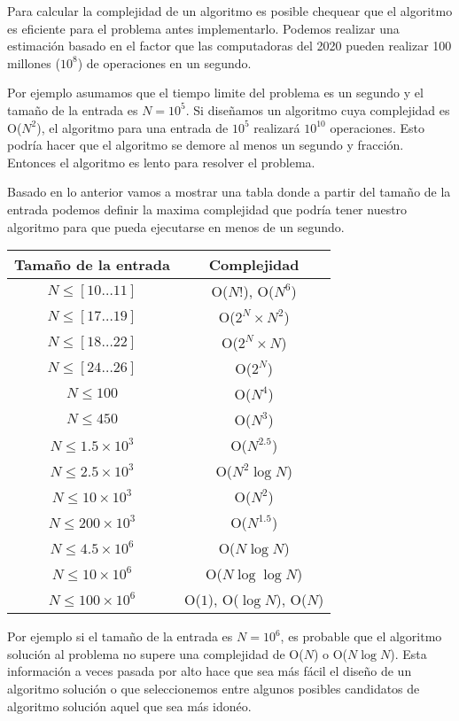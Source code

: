 Para calcular la complejidad de un algoritmo es posible chequear que el algoritmo es eficiente para el problema antes implementarlo. Podemos realizar una estimación basado en el factor que las computadoras del 2020 pueden realizar 100 millones ($10^{8}$) de operaciones en un segundo. 

Por ejemplo asumamos que el tiempo limite del problema es un segundo y el tamaño de la entrada es $N=10^5$. Si diseñamos un algoritmo cuya complejidad es O($N^2$), el algoritmo para una entrada de $10^5$ realizará $10^{10}$ operaciones. Esto podría hacer que el algoritmo se demore al menos un segundo y fracción. Entonces el algoritmo es lento para resolver el problema.

Basado en lo anterior vamos a mostrar una tabla donde a partir del tamaño de la entrada podemos definir la maxima complejidad que podría tener nuestro algoritmo para que pueda ejecutarse en menos de un segundo.

{\centering

\begin{tabular}{|c|c|}
	\hline
\textbf{Tamaño de la entrada}	&  \textbf{Complejidad} \\
	\hline
$N \le [10 \dots 11]$	& O($N!$), O($N^6$) \\
	\hline
$N \le [17\dots 19]$	& O($2^N\times N^2$) \\
	\hline
$N \le [18 \dots  22]$	& O($2^N \times N$)  \\
	\hline
$N \le [24 \dots  26]$	& O($2^N $)  \\
\hline	
$N \le 100$	& O($N^4 $)  \\
\hline
$N \le 450$	& O($N^3$)  \\
	\hline
$N \le 1.5\times 10^3$	& O($N^{2.5} $)  \\
\hline
$N \le 2.5\times 10^3$	& O($N^{2}\log N $)  \\
\hline
$N \le 10\times 10^3$	& O($N^2$)  \\
	\hline
$N \le 200\times 10^3$	& O($N^{1.5}$)  \\
\hline
$N \le 4.5\times 10^6$	& O($N\log N$) \\
\hline
$N \le 10\times 10^6 $	& O($N \log \log N$) \\
	\hline
$N \le 100\times 10^6$	& O($1$), O($\log N$), O($N$) \\
	\hline
\end{tabular}

}

Por ejemplo si el tamaño de la entrada es $N=10^6$, es probable que el algoritmo solución al problema no supere una complejidad de O($N$) o O($N \log N$). Esta información a veces pasada por alto hace que sea más fácil el diseño de un algoritmo solución o que seleccionemos entre algunos posibles candidatos de algoritmo solución aquel que sea más idonéo. 

